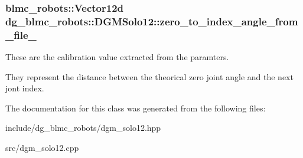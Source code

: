 \subsubsection[{\texorpdfstring{zero\+\_\+to\+\_\+index\+\_\+angle\+\_\+from\+\_\+file\+\_\+}{zero_to_index_angle_from_file_}}]{\setlength{\rightskip}{0pt plus 5cm}blmc\+\_\+robots\+::\+Vector12d dg\+\_\+blmc\+\_\+robots\+::\+D\+G\+M\+Solo12\+::zero\+\_\+to\+\_\+index\+\_\+angle\+\_\+from\+\_\+file\+\_\+\hspace{0.3cm}{\ttfamily [private]}}\hypertarget{classdg__blmc__robots_1_1DGMSolo12_abb9b4edf8c97cfecbaf87b6adaad8ad5}{}\label{classdg__blmc__robots_1_1DGMSolo12_abb9b4edf8c97cfecbaf87b6adaad8ad5}


These are the calibration value extracted from the paramters. 

They represent the distance between the theorical zero joint angle and the next jont index. 

The documentation for this class was generated from the following files\+:\begin{DoxyCompactItemize}
\item 
include/dg\+\_\+blmc\+\_\+robots/dgm\+\_\+solo12.\+hpp\item 
src/dgm\+\_\+solo12.\+cpp\end{DoxyCompactItemize}
